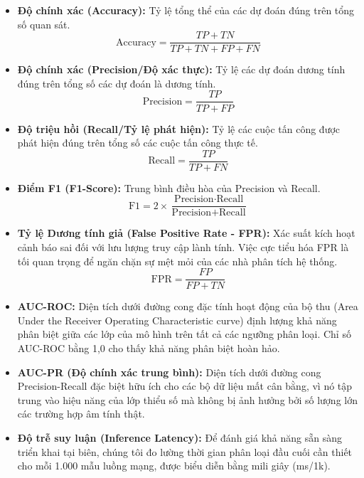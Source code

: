 \begin{itemize}
    \item \textbf{Độ chính xác (Accuracy):} Tỷ lệ tổng thể của các dự đoán đúng trên tổng số quan sát.
    \begin{equation}
        \text{Accuracy} = \frac{TP + TN}{TP + TN + FP + FN}
    \end{equation}

    \item \textbf{Độ chính xác (Precision/Độ xác thực):} Tỷ lệ các dự đoán dương tính đúng trên tổng số các dự đoán là dương tính.
    \begin{equation}
        \text{Precision} = \frac{TP}{TP + FP}
    \end{equation}

    \item \textbf{Độ triệu hồi (Recall/Tỷ lệ phát hiện):} Tỷ lệ các cuộc tấn công được phát hiện đúng trên tổng số các cuộc tấn công thực tế.
    \begin{equation}
        \text{Recall} = \frac{TP}{TP + FN}
    \end{equation}

    \item \textbf{Điểm F1 (F1-Score):} Trung bình điều hòa của Precision và Recall.
    \begin{equation}
        \text{F1} = 2 \times \frac{\text{Precision} \cdot \text{Recall}}{\text{Precision} + \text{Recall}}
    \end{equation}

    \item \textbf{Tỷ lệ Dương tính giả (False Positive Rate - FPR):} Xác suất kích hoạt cảnh báo sai đối với lưu lượng truy cập lành tính. Việc cực tiểu hóa FPR là tối quan trọng để ngăn chặn sự mệt mỏi của các nhà phân tích hệ thống.
    \begin{equation}
        \text{FPR} = \frac{FP}{FP + TN}
    \end{equation}

    \item \textbf{AUC-ROC:} Diện tích dưới đường cong đặc tính hoạt động của bộ thu (Area Under the Receiver Operating Characteristic curve) định lượng khả năng phân biệt giữa các lớp của mô hình trên tất cả các ngưỡng phân loại. Chỉ số AUC-ROC bằng 1,0 cho thấy khả năng phân biệt hoàn hảo.

    \item \textbf{AUC-PR (Độ chính xác trung bình):} Diện tích dưới đường cong Precision-Recall đặc biệt hữu ích cho các bộ dữ liệu mất cân bằng, vì nó tập trung vào hiệu năng của lớp thiểu số mà không bị ảnh hưởng bởi số lượng lớn các trường hợp âm tính thật.
    
    \item \textbf{Độ trễ suy luận (Inference Latency):} Để đánh giá khả năng sẵn sàng triển khai tại biên, chúng tôi đo lường thời gian phân loại đầu cuối cần thiết cho mỗi 1.000 mẫu luồng mạng, được biểu diễn bằng mili giây (ms/1k).
\end{itemize}


